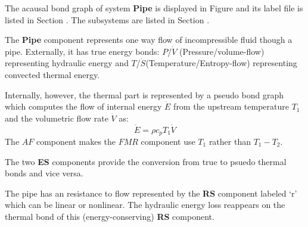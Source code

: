 

   The acausal bond graph of system \textbf{Pipe} is
   displayed in Figure  and its label
   file is listed in Section .
   The subsystems are listed in Section .

The \textbf{Pipe} component represents one way flow of incompressible
fluid though a pipe. Externally, it has true energy bonds: $P$/$\dot V$
(Pressure/volume-flow) representing hydraulic energy and $T$/$\dot
S$(Temperature/Entropy-flow) representing convected thermal energy.

Internally, however, the thermal part is represented by a pseudo bond
graph which computes the flow of internal energy $\dot E$ from the
upstream temperature $T_1$ and the volumetric flow rate $\dot V$ as:
\begin{equation}
  \dot E = \rho c_p T_1 \dot V
\end{equation}
The $AF$ component makes the $FMR$ component use $T_1$ rather than
$T_1-T_2$.

The two \textbf{ES} components provide the conversion from true to
psuedo thermal bonds and vice versa.

The pipe has an resistance to flow represented by the \textbf{RS}
component labeled `r' which can be linear or nonlinear. The hydraulic
energy loss reappears on the thermal bond of this (energy-conserving)
\textbf{RS} component.

